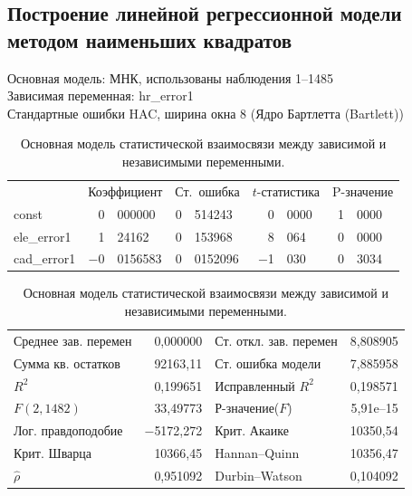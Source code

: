 \documentclass[a4paper,12pt]{article}
\begin{document}
\subsection{Построение линейной регрессионной модели методом наименьших квадратов}

\begin{table}[H]
\begin{center}
	
	Основная модель: МНК, использованы наблюдения 1--1485\\
	Зависимая переменная: hr\_error1\\
	Стандартные ошибки HAC, ширина окна 8 (Ядро Бартлетта (Bartlett))
	
	\vspace{1em}
	
	\begin{tabular}{lr@{,}lr@{,}lr@{,}lr@{,}l}
		&
		\multicolumn{2}{c}{Коэффициент} &
		\multicolumn{2}{c}{Ст.\ ошибка} &
		\multicolumn{2}{c}{$t$-статистика} &
		\multicolumn{2}{c}{P-значение} \\[1ex]
		const &
		0&000000 &
		0&514243 &
		0&0000 &
		1&0000 \\
		ele\_error1 &
		1&24162 &
		0&153968 &
		8&064 &
		0&0000 \\
		cad\_error1 &
		$-$0&0156583 &
		0&0152096 &
		$-$1&030 &
		0&3034 \\
	\end{tabular}
	
	\vspace{1ex}
	\begin{tabular}{lrlr}
		Среднее зав. перемен &  0,000000 & Ст. откл. зав. перемен &  8,808905 \\
		Сумма кв. остатков &  92163,11 & Ст. ошибка модели &  7,885958 \\
		$R^2$ &  0,199651 & Исправленный $R^2$ &  0,198571 \\
		$F(2, 1482)$ &  33,49773 & Р-значение($F$) &  5,91\textrm{e--15} \\
		Лог. правдоподобие & $-$5172,272 & Крит. Акаике &  10350,54 \\
		Крит. Шварца &  10366,45 & Hannan--Quinn &  10356,47 \\
		$\hat{\rho}$ &  0,951092 & Durbin--Watson &  0,104092 \\
	\end{tabular}
\end{center}
\caption{Основная модель статистической взаимосвязи между зависимой и независимыми переменными.}
\label{tab:table3}
\end{table}
\end{document}
